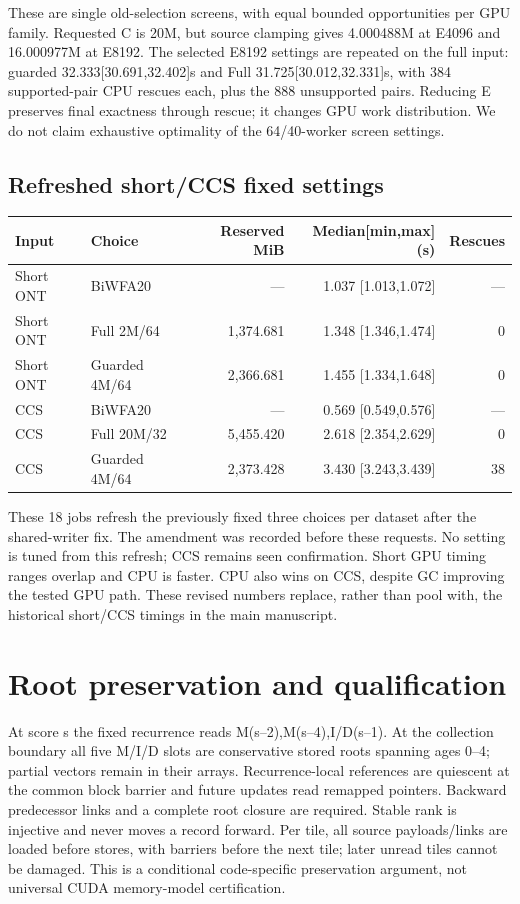 \documentclass[11pt,a4paper]{article}
\begin{document}
These are single old-selection screens, with equal bounded opportunities per GPU family. Requested C is 20M, but source clamping gives 4.000488M at E4096 and 16.000977M at E8192. The selected E8192 settings are repeated on the full input: guarded 32.333[30.691,32.402]s and Full 31.725[30.012,32.331]s, with 384 supported-pair CPU rescues each, plus the 888 unsupported pairs. Reducing E preserves final exactness through rescue; it changes GPU work distribution. We do not claim exhaustive optimality of the 64/40-worker screen settings.

\subsection{Refreshed short/CCS fixed settings}
\begin{center}\small\begin{tabular}{llrrr}\toprule
Input & Choice & Reserved MiB & Median[min,max](s) & Rescues\\\midrule
Short ONT & BiWFA20 & --- & 1.037 [1.013,1.072] & ---\\
Short ONT & Full 2M/64 & 1,374.681 & 1.348 [1.346,1.474] & 0\\
Short ONT & Guarded 4M/64 & 2,366.681 & 1.455 [1.334,1.648] & 0\\
CCS & BiWFA20 & --- & 0.569 [0.549,0.576] & ---\\
CCS & Full 20M/32 & 5,455.420 & 2.618 [2.354,2.629] & 0\\
CCS & Guarded 4M/64 & 2,373.428 & 3.430 [3.243,3.439] & 38\\
\bottomrule\end{tabular}\end{center}

These 18 jobs refresh the previously fixed three choices per dataset after the shared-writer fix. The amendment was recorded before these requests. No setting is tuned from this refresh; CCS remains seen confirmation. Short GPU timing ranges overlap and CPU is faster. CPU also wins on CCS, despite GC improving the tested GPU path. These revised numbers replace, rather than pool with, the historical short/CCS timings in the main manuscript.

\section{Root preservation and qualification}
At score s the fixed recurrence reads M(s--2),M(s--4),I/D(s--1). At the collection boundary all five M/I/D slots are conservative stored roots spanning ages 0--4; partial vectors remain in their arrays. Recurrence-local references are quiescent at the common block barrier and future updates read remapped pointers. Backward predecessor links and a complete root closure are required. Stable rank is injective and never moves a record forward. Per tile, all source payloads/links are loaded before stores, with barriers before the next tile; later unread tiles cannot be damaged. This is a conditional code-specific preservation argument, not universal CUDA memory-model certification.
\end{document}
